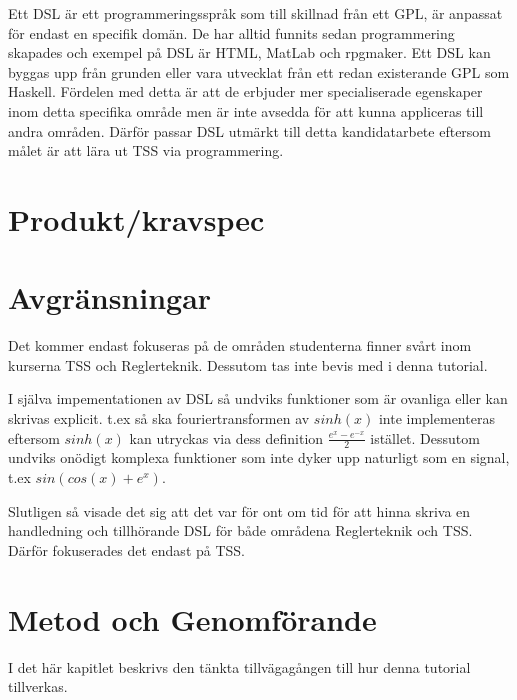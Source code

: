 \documentclass[]{article}
\begin{document}
Ett DSL är ett programmeringsspråk som till skillnad från ett GPL, är anpassat
för endast en specifik domän. De har alltid funnits sedan programmering
skapades och exempel på DSL är HTML, MatLab och rpgmaker. Ett DSL kan
byggas upp från grunden eller vara utvecklat från ett redan existerande GPL
som Haskell. Fördelen med detta är att de erbjuder mer specialiserade egenskaper
inom detta specifika område men är inte avsedda för att kunna appliceras till andra
områden. Därför passar DSL utmärkt till detta kandidatarbete eftersom målet är
att lära ut TSS via programmering.

\section{Produkt/kravspec}

\section{Avgränsningar}

%

Det kommer endast fokuseras på de områden studenterna finner svårt inom
kurserna TSS och Reglerteknik. Dessutom tas inte bevis med i denna tutorial.

I själva impementationen av DSL så undviks funktioner som är
ovanliga eller kan skrivas explicit. t.ex så ska fouriertransformen av
$sinh(x)$ inte implementeras eftersom $sinh(x)$ kan utryckas via dess
definition $\frac{e^{x} - e^{-x}}{2}$ istället.
Dessutom undviks onödigt komplexa funktioner som inte
dyker upp naturligt som en signal, t.ex $sin(cos(x)+e^x)$.

Slutligen så visade det sig att det var för ont om tid för att hinna
skriva en handledning och tillhörande DSL för både områdena Reglerteknik och TSS.
Därför fokuserades det endast på TSS.

\section{Metod och Genomförande}


I det här kapitlet beskrivs den tänkta tillvägagången till hur denna
tutorial tillverkas.
\end{document}
